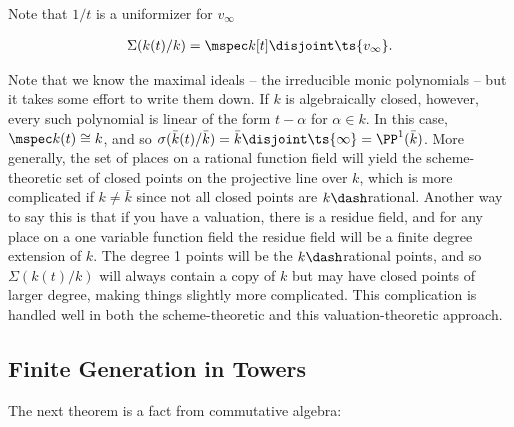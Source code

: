 Note that \(1/t\) is a uniformizer for \(v_ \infty\)

\begin{theorem}

\begin{align*}  
\Sigma(k(t) / k) = \mspec k[t] \disjoint \ts{v_ \infty}
.\end{align*}

\end{theorem}

Note that we know the maximal ideals -- the irreducible monic
polynomials -- but it takes some effort to write them down. If \(k\) is
algebraically closed, however, every such polynomial is linear of the
form \(t-\alpha\) for \(\alpha\in k\). In this case,
\(\mspec k(t) \cong k\), and so
\(\sigma( \bar k (t) / \bar k) = \bar k \disjoint \ts{\infty} = \PP^1(\bar k)\).
More generally, the set of places on a rational function field will
yield the scheme-theoretic set of closed points on the projective line
over \(k\), which is more complicated if \(k\neq \bar k\) since not all
closed points are \(k\dash\)rational. Another way to say this is that if
you have a valuation, there is a residue field, and for any place on a
one variable function field the residue field will be a finite degree
extension of \(k\). The degree 1 points will be the \(k\dash\)rational
points, and so \(\Sigma(k(t) / k)\) will always contain a copy of \(k\)
but may have closed points of larger degree, making things slightly more
complicated. This complication is handled well in both the
scheme-theoretic and this valuation-theoretic approach.

\hypertarget{finite-generation-in-towers}{%
\subsection{Finite Generation in
Towers}\label{finite-generation-in-towers}}

The next theorem is a fact from commutative algebra:

